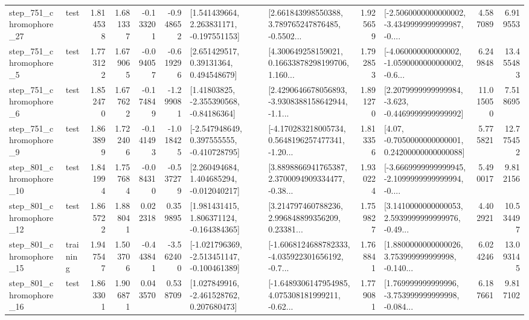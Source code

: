 \begin{tabular}{llrrrrllrlrr}
  step\_751\_chromophore\_27 &      test &      1.814538 &    1.681337 &     -0.133201 & -0.948652 &    [1.541439664, 2.263831171, -0.197551153] &  [2.661843998550388, 3.789765247876485, -0.5502... &       1.925659 &  [-2.5060000000000002, -3.4349999999999987, -0.... &            4.587089 &          6.919553 \\
   step\_751\_chromophore\_5 &      test &      1.773122 &    1.679065 &     -0.094057 & -0.619296 &      [2.651429517, 0.39131364, 0.494548679] &  [4.300649258159021, 0.16633878298199706, 1.160... &       1.792853 &  [-4.060000000000002, -1.0590000000000002, -0.6... &            6.249848 &         13.455483 \\
   step\_751\_chromophore\_6 &      test &      1.852470 &    1.677622 &     -0.174849 & -1.299081 &     [1.41803825, -2.355390568, -0.84186364] &  [2.4290646678056893, -3.9308388158642944, -1.1... &       1.891270 &  [2.2079999999999984, -3.623, -0.4469999999999992] &           11.015050 &          7.518695 \\
   step\_751\_chromophore\_9 &      test &      1.863899 &    1.722406 &     -0.141493 & -1.018425 &   [-2.547948649, 0.397555555, -0.410728795] &  [-4.170283218005734, 0.5648196257477341, -1.20... &       1.813356 &   [4.07, -0.7050000000000001, 0.24200000000000088] &            5.775821 &         12.775452 \\
  step\_801\_chromophore\_10 &      test &      1.841994 &    1.757684 &     -0.084310 & -0.537279 &    [2.260494684, 1.404685294, -0.012040217] &  [3.8898866941765387, 2.3700094909334477, -0.38... &       1.930224 &  [-3.6669999999999945, -2.1099999999999994, -0.... &            5.490017 &          9.812156 \\
  step\_801\_chromophore\_12 &      test &      1.865722 &    1.888041 &      0.022318 &  0.359895 &    [1.981431415, 1.806371124, -0.164384365] &  [3.214797460788236, 2.996848899356209, 0.23381... &       1.759827 &  [3.1410000000000053, 2.5939999999999976, -0.49... &            4.402921 &         10.534497 \\
  step\_801\_chromophore\_15 &  training &      1.947547 &    1.503706 &     -0.443841 & -3.562400 &  [-1.021796369, -2.513451147, -0.100461389] &  [-1.6068124688782333, -4.035922301656192, -0.7... &       1.768841 &  [1.8800000000000026, 3.753999999999998, -0.140... &            6.024246 &         13.093145 \\
  step\_801\_chromophore\_16 &      test &      1.863301 &    1.906871 &      0.043570 &  0.538709 &    [1.027849916, -2.461528762, 0.207680473] &  [-1.6489306147954985, 4.075308181999211, -0.62... &       1.779081 &  [1.769999999999996, -3.753999999999998, -0.084... &            6.187661 &          9.817102 \\

\end{tabular}
